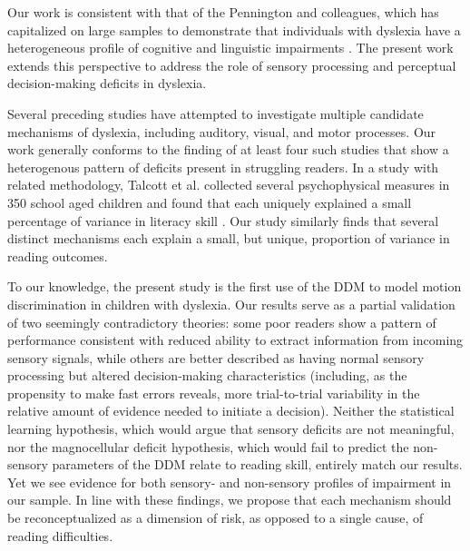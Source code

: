 \documentclass[../uwthesis.tex]{subfiles}
\begin{document}
Our work is consistent with that of the Pennington and colleagues, which has capitalized on large samples to demonstrate that individuals with dyslexia have a heterogeneous profile of cognitive and linguistic impairments \cite{Pennington2006,Pennington2012IndividualModels.,Peterson2015}. The present work extends this perspective to address the role of sensory processing and perceptual decision-making deficits in dyslexia. 

Several preceding studies have attempted to investigate multiple candidate mechanisms of dyslexia, including auditory, visual, and motor processes. Our work generally conforms to the finding of at least four such studies \cite{Ho2002TheDyslexia.,Menghini2010DevelopmentalMemory.,Ramus2003,White2006}
that show a heterogenous pattern of deficits present in struggling readers. In a study with related methodology, Talcott et al. collected several psychophysical measures in 350 school aged children and found that each uniquely explained a small percentage of variance in literacy skill \cite{Talcott2002}. Our study similarly finds that several distinct mechanisms each explain a small, but unique, proportion of variance in reading outcomes. 

To our knowledge, the present study is the first use of the DDM to model motion discrimination in children with dyslexia. Our results serve as a partial validation of two seemingly contradictory theories: some poor readers show a pattern of performance consistent with reduced ability to extract information from incoming sensory signals, while others are better described as having normal sensory processing but altered decision-making characteristics (including, as the propensity to make fast errors reveals, more trial-to-trial variability in the relative amount of evidence needed to initiate a decision). Neither the statistical learning hypothesis, which would argue that sensory deficits are not meaningful, nor the magnocellular deficit hypothesis, which would fail to predict the non-sensory parameters of the DDM relate to reading skill, entirely match our results. Yet we see evidence for both sensory- and non-sensory profiles of impairment in our sample. In line with these findings, we propose that each mechanism should be reconceptualized as a dimension of risk, as opposed to a single cause, of reading difficulties.
\end{document}
